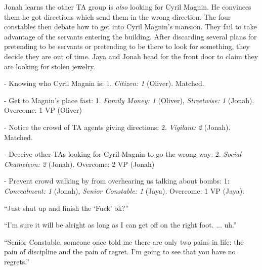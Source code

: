 Jonah learns the other TA group is \textit{also} looking for Cyril Magnin.  He convinces them he got directions which send them in the wrong direction.  The four constables then debate how to get into Cyril Magnin's mansion.  They fail to take advantage of the servants entering the building.  After discarding several plans for pretending to be servants or pretending to be there to look for something, they decide they are out of time.  Jaya and Jonah head for the front door to claim they are looking for stolen jewelry.




{
\parskip=0pt

- Knowing who Cyril Magnin is: 1.  \textit{Citizen: 1} (Oliver).  Matched.

- Get to Magnin's place fast: 1.  \textit{Family Money: 1} (Oliver), \textit{Streetwise: 1} (Jonah). Overcome: 1 VP (Oliver)

- Notice the crowd of TA agents giving directions: 2.  \textit{Vigilant: 2} (Jonah).  Matched.

- Deceive other TAs looking for Cyril Magnin to go the wrong way: 2.  \textit{Social Chameleon: 2} (Jonah). Overcome: 2 VP (Jonah)

- Prevent crowd walking by from overhearing us talking about bombs: 1: \textit{Concealment: 1} (Jonah), \textit{Senior Constable: 1} (Jaya).  Overcome: 1 VP (Jaya).
}





``Just shut up and finish the `Fuck' ok?''




``I'm sure it will be alright as long as I can get off on the right foot. ... uh.'' 





``Senior Constable, someone once told me there are only two pains in life: the pain of discipline and the pain of regret.  I'm going to see that you have no regrets.''

